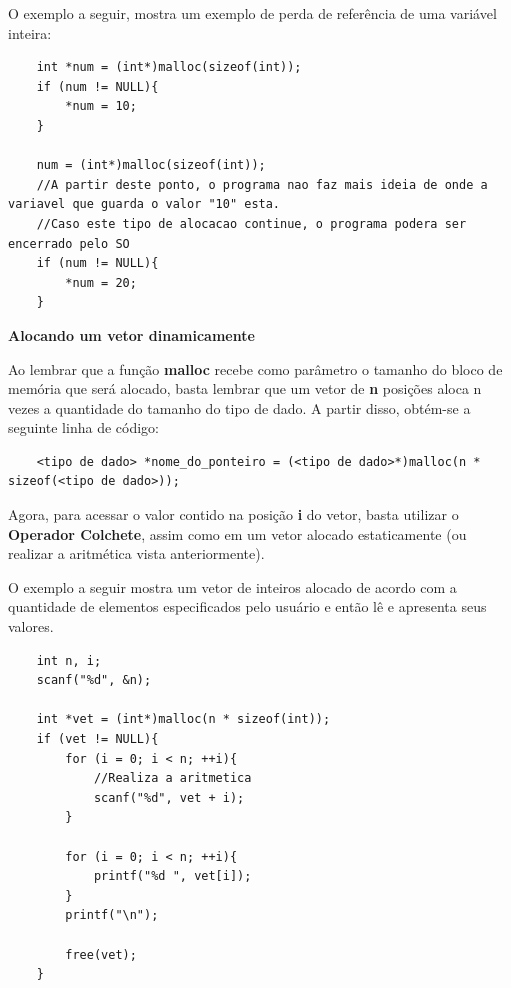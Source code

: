 \documentclass[12pt]{article}
\newcommand\tab[1][1cm]{\hspace*{#1}}
\begin{document}
\par\tab O exemplo a seguir, mostra um exemplo de perda de referência de uma variável inteira:

\hspace{0.25cm}
\begin{lstlisting}
    int *num = (int*)malloc(sizeof(int));
    if (num != NULL){
        *num = 10;
    }
    
    num = (int*)malloc(sizeof(int));
    //A partir deste ponto, o programa nao faz mais ideia de onde a variavel que guarda o valor "10" esta.
    //Caso este tipo de alocacao continue, o programa podera ser encerrado pelo SO
    if (num != NULL){
        *num = 20;
    }
\end{lstlisting}

\hspace{2cm}
\par\tab\textbf{Alocando um vetor dinamicamente}

\par\tab Ao lembrar que a função \textbf{malloc} recebe como parâmetro o tamanho do bloco de memória que será alocado, basta lembrar que um vetor de \textbf{n} posições aloca n vezes a quantidade do tamanho do tipo de dado. A partir disso, obtém-se a seguinte linha de código:

\hspace{0.25cm}
\begin{lstlisting}
    <tipo de dado> *nome_do_ponteiro = (<tipo de dado>*)malloc(n * sizeof(<tipo de dado>));
\end{lstlisting}

\par\tab Agora, para acessar o valor contido na posição \textbf{i} do vetor, basta utilizar o \textbf{Operador Colchete}, assim como em um vetor alocado estaticamente (ou realizar a aritmética vista anteriormente).

\par\tab O exemplo a seguir mostra um vetor de inteiros alocado de acordo com a quantidade de elementos especificados pelo usuário e então lê e apresenta seus valores.

\hspace{0.25cm}
\begin{lstlisting}
    int n, i;
    scanf("%d", &n);
    
    int *vet = (int*)malloc(n * sizeof(int));
    if (vet != NULL){
        for (i = 0; i < n; ++i){
            //Realiza a aritmetica
            scanf("%d", vet + i);
        }
        
        for (i = 0; i < n; ++i){
            printf("%d ", vet[i]);
        }
        printf("\n");
        
        free(vet);
    }
\end{lstlisting}
\end{document}
